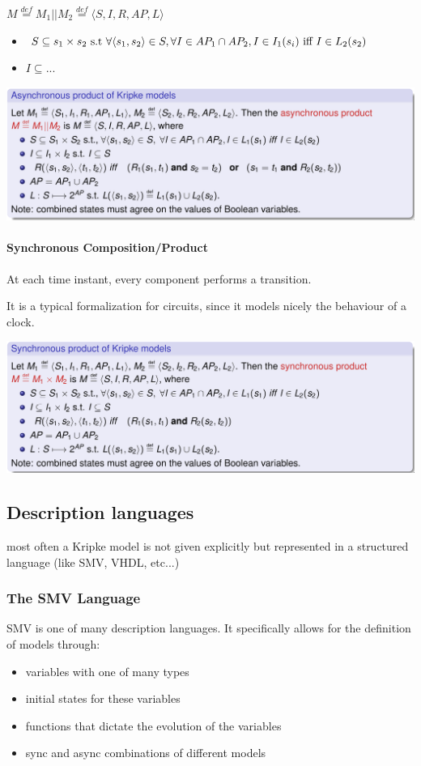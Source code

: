 \documentclass{article}
\begin{document}
$M\overset{def}= M_1||M_2\overset{def}= \langle S,I,R,AP,L\rangle$
\begin{itemize}
    \item $S \subseteq s_1\times s_2 \text{ s.t } \forall\langle s_1,s_2\rangle \in S, \forall I \in AP_1\cap AP_2, I\in I_1(s_i) \text{ iff } I \in L_2(s_2)$
    \item $I \subseteq ...$
\end{itemize}
\begin{center}
    \includegraphics[width=1\linewidth]{images/async_prod.png}
\end{center}

\paragraph{Synchronous Composition/Product} At each time instant, every component performs a transition.

It is a typical formalization for circuits, since it models nicely the behaviour of a clock.
\begin{center}
    \includegraphics[width=1\linewidth]{images/sync_prod.png}
\end{center}

\subsection{Description languages}
most often a Kripke model is not given explicitly but represented in a structured language (like SMV, VHDL, etc...)

\subsubsection{The SMV Language}
SMV is one of many description languages. It specifically allows for the definition of models through:
\begin{itemize}
    \item variables with one of many types
    \item initial states for these variables
    \item functions that dictate the evolution of the variables
    \item sync and async combinations of different models
\end{itemize}
\end{document}
